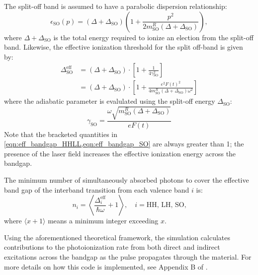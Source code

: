The split-off band is assumed to have a parabolic dispersion relationship:
\begin{equation}
\epsilon_{\textrm{SO}}(p) = (\Delta+\Delta_{\textrm{SO}}) \left( 1 + \frac{p^2}{2 m_{\textrm{SO}}^R (\Delta+\Delta_{\textrm{SO}})}  \right),
\end{equation}
where $\Delta + \Delta_{\textrm{SO}}$ is the total energy required to ionize an election from the split-off band. Likewise, the effective ionization threshold for the split off-band is given by:
\begin{equation}
\begin{aligned}
\Delta_{\textrm{SO}}^{\textrm{eff}} &= (\Delta + \Delta_{\textrm{SO}}) \cdot \left[ 1 + \frac{1}{4 \gamma^2_{\textrm{SO}}} \right] \\
&= (\Delta + \Delta_{\textrm{SO}}) \cdot \left[1 + \frac{e^2 F(t)^2}{4 m_{\textrm{SO}}^R (\Delta + \Delta_{\textrm{SO}}) \omega^2} \right]
\end{aligned}
\label{eqn:eff_bandgap_SO}
\end{equation}
where the adiabatic parameter is evalulated using the split-off energy $\Delta_{\textrm{SO}}$:
\begin{equation}
\gamma_{\textrm{SO}} = \frac{\omega \sqrt{m_{\textrm{SO}}^R (\Delta + \Delta_{\textrm{SO}})}}{e F(t)}
\end{equation}
Note that the bracketed quantities in \cref{eqn:eff_bandgap_HHLL,eqn:eff_bandgap_SO} are always greater than 1; the presence of the laser field increases the effective ionization energy across the bandgap.

The minimum number of simultaneously absorbed photons to cover the effective band gap of the interband transition from each valence band $i$ is:
\begin{equation}
n_i = \left\langle  \frac{\Delta_i^{\textrm{eff}}}{\hbar \omega} + 1 \right\rangle, \quad i = \textrm{HH, LH, SO,}
\label{eqn:min_number_photons}
\end{equation}
where $\langle x+1 \rangle$ means a minimum integer exceeding $x$.

Using the aforementioned theoretical framework, the simulation calculates contributions to the photoionization rate from both direct and indirect excitations across the bandgap as the pulse propagates through the material. For more details on how this code is implemented, see Appendix B of \cite{austinSemiconductorSurfaceModification2017}.

